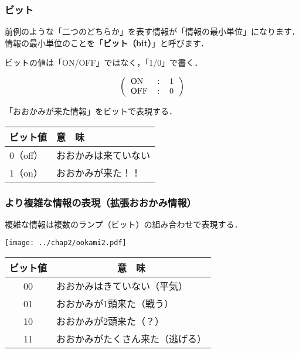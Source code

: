 \documentclass{beamer}                 %
\begin{document}
\begin{frame}
  \frametitle{ビット}
  前例のような「二つのどちらか」を表す情報が「情報の最小単位」になります．
    情報の最小単位のことを「{\bf ビット（bit）}」と呼びます．

\begin{center}
\end{center}

ビットの値は「ON/OFF」ではなく，「1/0」で書く．
\begin{center}
{\small\[\left(\begin{tabular}{l c l}
ON  & : & 1 \\
OFF & : & 0
\end{tabular}\right)\]}
\end{center}

「おおかみが来た情報」をビットで表現する．
  \begin{center}
    \begin{tabular}{l | l}\hline\hline
      ビット値  &  意　味 \\\hline
      0（off）  & おおかみは来ていない \\
      1（on）   & おおかみが来た！！
    \end{tabular}
  \end{center}

\end{frame}

\begin{frame}
  \frametitle{より複雑な情報の表現（拡張おおかみ情報）}
  複雑な情報は複数のランプ（ビット）の組み合わせで表現する．
  \begin{center}
    \texttt{[image: ../chap2/ookami2.pdf]}
    {\small\begin{tabular}{c|l} \hline\hline
      ビット値 & \multicolumn{1}{c}{意　味}  \\
      \hline
      00 & おおかみはきていない（平気）      \\
      01 & おおかみが1頭来た（戦う）         \\
      10 & おおかみが2頭来た（？）           \\
      11 & おおかみがたくさん来た（逃げる）  \\
    \end{tabular}}
  \end{center}
\end{frame}
\end{document}
